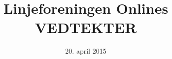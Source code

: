 \documentclass{vedtekter}
\title{\Large{}Linjeforeningen Onlines\\\Huge{VEDTEKTER}}
\date{20. april 2015}	%
\begin{document}
\maketitle
\small{}
\tableofcontents
\newpage
\normalsize{}









\end{document}
